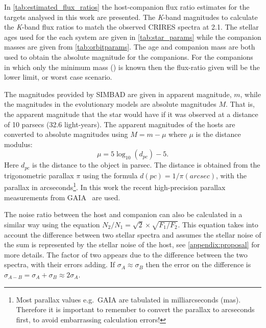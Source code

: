 In \cref{tab:estimated_flux_ratios} the host-companion flux ratio estimates for the targets analysed in this work are presented.
The \emph{K}-band magnitudes to calculate the \emph{K}-band flux ratios to match the observed {CRIRES} spectra at 2.1\um{}.
The stellar ages used for the each system are given in \cref{tab:star_params} while the companion masses are given from \cref{tab:orbitparams}.
The age and companion mass are both used to obtain the absolute magnitude for the companions.
For the companions in which only the minimum mass (\Mtwosini{}) is known then the flux-ratio given will be the lower limit, or worst case scenario.


The magnitudes provided by {SIMBAD} are given in apparent magnitude, \(m\), while the magnitudes in the evolutionary models are absolute magnitudes \(M\).
That is, the apparent magnitude that the star would have if it was observed at a distance of 10 parsecs (32.6 light-years).
The apparent magnitudes of the hosts are converted to absolute magnitudes using \(M = m - \mu\) where \(\mu\) is the distance modulus:
\begin{equation}
\mu = 5 \log_{10}(d_{pc}) -5.\label{eqn:distance_modulus}
\end{equation}
Here $d_{pc}$ is the distance to the object in parsec.
The distance is obtained from the trigonometric parallax  $\pi$ using the formula $d(pc) = 1 /\pi(arcsec)$, with the parallax in arcseconds\footnote{Most parallax values e.g.\ GAIA are tabulated in milliarcseconds (mas).
Therefore it is important to remember to convert the parallax to arcseconds first, to avoid embarrassing calculation errors!}.
In this work the recent high-precision parallax measurements from GAIA~\citep{gaiacollaboration_gaia_2018} are used.

The noise ratio between the host and companion can also be calculated in a similar way using the equation \(N_{2}/N_{1} = \sqrt{2} \times\sqrt{F_{1}/F_{2}}\).
This equation takes into account the difference between two stellar spectra and assumes the stellar noise of the sum is represented by the stellar noise of the host, see \cref{appendix:proposal} for more details.
The factor of two appears due to the difference between the two spectra, with their errors adding.
If \(\sigma_{A}\approx\sigma_B\) then the error on the difference is \(\sigma_{A-B} = \sigma_{A} + \sigma_{B} \approx 2\sigma_{A}\).

